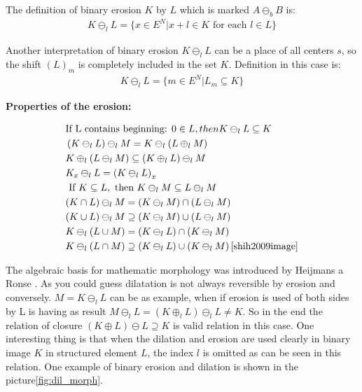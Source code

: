 The definition of binary erosion $K$ by $L$ which is marked $A \ominus_b B$ is:\cite{dil1} \cite{dil2}
\begin{align} 
	K \ominus_l L = \{ x \in E^N | x+l \in K \textrm{ for each } l \in L \}
\end{align}

Another interpretation of binary erosion $K \ominus_l L$ can be a place of all centers $s$, so the shift $(L)_m$ is completely included in the set $K$. Definition in this case is:\cite{dil2}
\begin{align} 
K \ominus_l L = \{ m \in E^N | L_m \subseteq K \}
\end{align}

\textbf{Properties of the erosion:}

\begin{align}
    &\text{If L contains beginning: }0 \in L, then K \ominus_l L \subseteq K\\
    &\left(K \ominus_{l} L\right) \ominus_{l} M=K \ominus_{l}\left(L \oplus_{l} M\right)\\
    &K \oplus_{l}\left(L \ominus_{l} M\right) \subseteq\left(K \oplus_{l} L\right) \ominus_{l} M\\
    &K_{x} \ominus_{l} L=\left(K \ominus_{l} L\right)_{x}\\
    &\text { If } K \subseteq L, \text { then } K \ominus_{l} M \subseteq L \ominus_{l} M\\
    &(K \cap L) \ominus_{l} M=\left(K \ominus_{l} M\right) \cap\left(L \ominus_{l} M\right)\\
    &(K \cup L) \ominus_{l} M \supseteq\left(K \ominus_{l} M\right) \cup\left(L \ominus_{l} M\right)\\
    &K \ominus_{l}(L \cup M)=\left(K \ominus_{l} L\right) \cap\left(K \ominus_{l} M\right)\\
    &K \ominus_{l}(L \cap M) \supseteq\left(K \ominus_{l} L\right) \cup\left(K \ominus_{l} M\right)
    \cite{shih2009image}
\end{align}

The algebraic basis for mathematic morphology was introduced by Heijmans a Ronse \cite{heijmans1990algebraic}. As you could guess dilatation is not always reversible by erosion and conversely. $M = K \ominus_l L$ can be as example, when if erosion is used of both sides by L is having as result $M \ominus_l L = (K \oplus_l L) \ominus_l L \neq K$. So in the end the relation of closure $(K \oplus L) \ominus L \supseteq K$ is valid relation in this case. One interesting thing is that when the dilation and erosion are used clearly in binary image $K$ in structured element $L$, the index $l$ is omitted as can be seen in this relation. One example of binary erosion and dilation is shown in the picture\ref{fig:dil_morph}.

